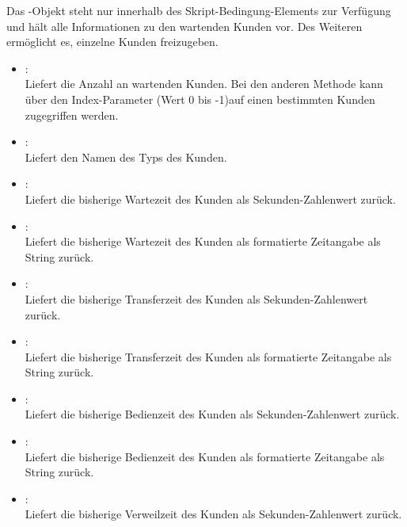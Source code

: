 Das -Objekt steht nur innerhalb des Skript-Bedingung-Elements zur Verfügung
und hält alle Informationen zu den wartenden Kunden vor. Des Weiteren ermöglicht es,
einzelne Kunden freizugeben.

\begin{itemize}

\item
{}:\\
Liefert die Anzahl an wartenden Kunden. Bei den anderen Methode kann
über den Index-Parameter (Wert 0 bis -1)auf einen bestimmten
Kunden zugegriffen werden.

\item
{}:\\
Liefert den Namen des Typs des Kunden.

\item
{}:\\
Liefert die bisherige Wartezeit des Kunden als Sekunden-Zahlenwert zurück.

\item
{}:\\
Liefert die bisherige Wartezeit des Kunden als formatierte Zeitangabe als String zurück.

\item
{}:\\
Liefert die bisherige Transferzeit des Kunden als Sekunden-Zahlenwert zurück.

\item
{}:\\
Liefert die bisherige Transferzeit des Kunden als formatierte Zeitangabe als String zurück.

\item
{}:\\
Liefert die bisherige Bedienzeit des Kunden als Sekunden-Zahlenwert zurück.

\item
{}:\\
Liefert die bisherige Bedienzeit des Kunden als formatierte Zeitangabe als String zurück.

\item
{}:\\
Liefert die bisherige Verweilzeit des Kunden als Sekunden-Zahlenwert zurück.


\end{itemize}
